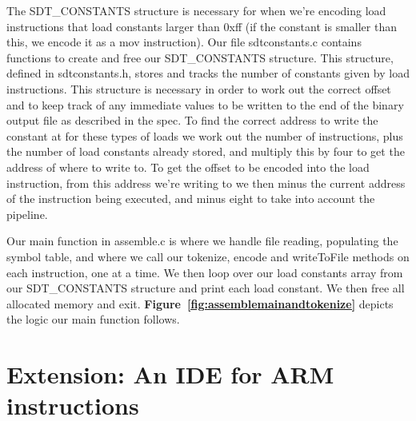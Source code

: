 \documentclass[11pt]{article}
\begin{document}
The SDT\_CONSTANTS structure is necessary for when we're encoding load instructions that load constants larger than 0xff (if the constant is smaller than this, we encode it as a mov instruction). Our file sdtconstants.c contains functions to create and free our SDT\_CONSTANTS structure. This structure, defined in sdtconstants.h, stores and tracks the number of constants given by load instructions. This structure is necessary in order to work out the correct offset and to keep track of any immediate values to be written to the end of the binary output file as described in the spec. To find the correct address to write the constant at for these types of loads we work out the number of instructions, plus the number of load constants already stored, and multiply this by four to get the address of where to write to. To get the offset to be encoded into the load instruction, from this address we're writing to we then minus the current address of the instruction being executed, and minus eight to take into account the pipeline.

Our main function in assemble.c is where we handle file reading, populating the symbol table, and where we call our tokenize, encode and writeToFile methods on each instruction, one at a time. We then loop over our load constants array from our SDT\_CONSTANTS structure and print each load constant. We then free all allocated memory and exit. \textbf{Figure~\ref{fig:assemblemainandtokenize}} depicts the logic our main function follows.


\section*{Extension: An IDE for ARM instructions}
\end{document}

